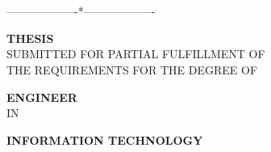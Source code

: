 \begin{titlepage}
 
	\thispagestyle{empty}
	\vspace{-20pt}
	\begin{center}
		\fontsize{14}{16}\selectfont
		\MakeUppercase{\universityTitle}\\
		\MakeUppercase{\schoolName}\\
		-------------------*------------------- \\
		\vspace{100pt}

		\fontsize{26}{28}\selectfont
		\MakeUppercase{\textbf{Thesis}}\\
		\vspace{10pt}
		\fontsize{14}{16}\selectfont
		\MakeUppercase{Submitted for partial fulfillment of}\\
		\MakeUppercase{the requirements for the degree of}\\
		
		\vspace{4pt}

		\fontsize{26}{28}\selectfont
		\MakeUppercase{\textbf{Engineer}}\\
		\vspace{10pt}
		\fontsize{14}{16}\selectfont
		\MakeUppercase{IN}\\
		\vspace{10pt}

		\fontsize{22}{24}\selectfont
		\MakeUppercase{\textbf{Information Technology}}\\

		\vspace{40pt}

		\begin{minipage}{0.96\linewidth}
			\begin{center}
			\fontsize{22}{22}\selectfont
			\MakeUppercase{\textbf{\thesisTitle}}\\
			\end{center}
		\end{minipage}


\end{center}
\end{titlepage}
